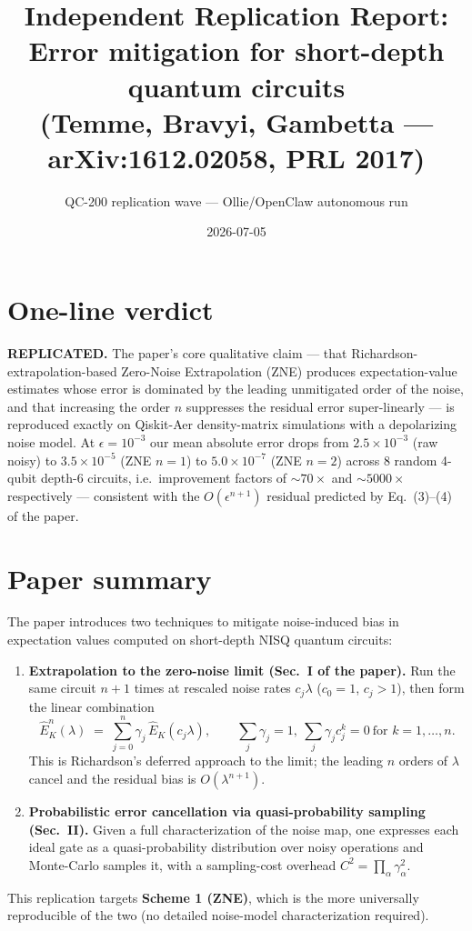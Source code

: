 \documentclass[11pt]{article}
\title{Independent Replication Report:\\
Error mitigation for short-depth quantum circuits\\
\normalsize (Temme, Bravyi, Gambetta --- arXiv:1612.02058, PRL 2017)}
\author{QC-200 replication wave --- Ollie/OpenClaw autonomous run}
\date{2026-07-05}
\begin{document}
\maketitle

\section*{One-line verdict}
\textbf{REPLICATED.} The paper's core qualitative claim --- that Richardson-extrapolation-based
Zero-Noise Extrapolation (ZNE) produces expectation-value estimates whose error is dominated by
the leading unmitigated order of the noise, and that increasing the order $n$ suppresses the
residual error super-linearly --- is reproduced exactly on Qiskit-Aer density-matrix simulations
with a depolarizing noise model. At $\epsilon = 10^{-3}$ our mean absolute error drops from
$2.5\!\times\!10^{-3}$ (raw noisy) to $3.5\!\times\!10^{-5}$ (ZNE $n{=}1$) to
$5.0\!\times\!10^{-7}$ (ZNE $n{=}2$) across 8 random 4-qubit depth-6 circuits, i.e.\ improvement
factors of $\sim\!70\times$ and $\sim\!5000\times$ respectively --- consistent with the
$O(\epsilon^{n+1})$ residual predicted by Eq.~(3)--(4) of the paper.

\section{Paper summary}
The paper introduces two techniques to mitigate noise-induced bias in expectation values
computed on short-depth NISQ quantum circuits:
\begin{enumerate}
  \item \textbf{Extrapolation to the zero-noise limit (Sec.~I of the paper).} Run the same
    circuit $n{+}1$ times at rescaled noise rates $c_j \lambda$ ($c_0{=}1$, $c_j>1$), then form
    the linear combination
    \[
      \hat{E}^n_K(\lambda) \;=\; \sum_{j=0}^{n} \gamma_j \, \hat{E}_K(c_j\lambda),
      \qquad
      \sum_j \gamma_j = 1,\ \sum_j \gamma_j c_j^k = 0\ \text{for } k = 1,\dots,n.
    \]
    This is Richardson's deferred approach to the limit; the leading $n$ orders of
    $\lambda$ cancel and the residual bias is $O(\lambda^{n+1})$.
  \item \textbf{Probabilistic error cancellation via quasi-probability sampling (Sec.~II).}
    Given a full characterization of the noise map, one expresses each ideal gate as a
    quasi-probability distribution over noisy operations and Monte-Carlo samples it, with a
    sampling-cost overhead $C^2 = \prod_\alpha \gamma_\alpha^2$.
\end{enumerate}
This replication targets \textbf{Scheme 1 (ZNE)}, which is the more universally reproducible of
the two (no detailed noise-model characterization required).
\end{document}
